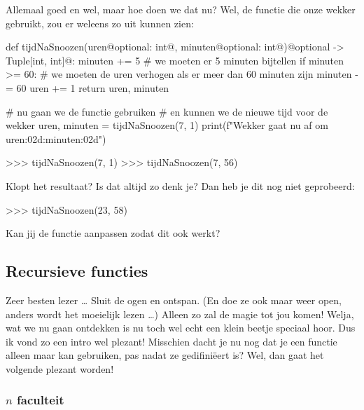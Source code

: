 Allemaal goed en wel, maar hoe doen we dat nu?
Wel, de functie die onze wekker gebruikt,
zou er weleens zo uit kunnen zien:
\begin{pyEnv}
def tijdNaSnoozen(uren@optional: int@, minuten@optional: int@)@optional -> Tuple[int, int]@:
    minuten += 5            # we moeten er 5 minuten bijtellen
	if minuten >= 60:
	    # we moeten de uren verhogen als er meer dan 60 minuten zijn
	    minuten -= 60
		uren += 1
	return uren, minuten

# nu gaan we de functie gebruiken
# en kunnen we de nieuwe tijd voor de wekker
uren, minuten = tijdNaSnoozen(7, 1)
print(f"Wekker gaat nu af om {uren:02d}:{minuten:02d}")
\end{pyEnv}

\begin{letsTryOut}
\begin{pyEnv}
>>> tijdNaSnoozen(7, 1)
>>> tijdNaSnoozen(7, 56)
\end{pyEnv}
	Klopt het resultaat?
	\newline
	Is dat altijd zo denk je?
	Dan heb je dit nog niet geprobeerd:
\begin{pyEnv}
>>> tijdNaSnoozen(23, 58)
\end{pyEnv}
	Kan jij de functie aanpassen zodat dit ook werkt?
\end{letsTryOut}

\subsection{Recursieve functies}

Zeer besten lezer \dots
\newline
Sluit de ogen en ontspan.
\newline
(En doe ze ook maar weer open, anders wordt het moeielijk lezen \dots)
\newline
Alleen zo zal de magie tot jou komen!
\newline
\newline
Welja, wat we nu gaan ontdekken is nu toch wel echt een klein beetje speciaal hoor.
Dus ik vond zo een intro wel plezant!
Misschien dacht je nu nog dat je een functie alleen maar kan gebruiken, pas nadat ze gedifini\"eert is?
Wel, dan gaat het volgende plezant worden!

\subsubsection{$n$ faculteit}

